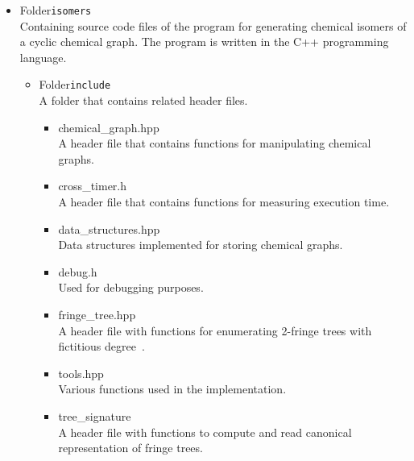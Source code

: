 \documentclass[11pt,titlepage,dvipdfmx,twoside]{article}
\begin{document}
%
\begin{itemize}
\item Folder{\tt isomers}\\
	Containing source code files of the program for generating chemical isomers of a cyclic chemical graph.
	The program is written in the C++ programming language.
	\begin{itemize}
	\item Folder{\tt include}\\
		A folder that contains related header files.
		\begin{itemize}
			\item{chemical\_graph.hpp}\\
			  A header file that contains functions for manipulating 
			  chemical graphs.
			\item{cross\_timer.h}\\
				A header file that contains functions for 
				measuring execution time.
				
			\item{data\_structures.hpp}\\
				Data structures implemented for storing 
				chemical graphs.
				
			\item{debug.h}\\
				Used for debugging purposes.
				
			\item{fringe\_tree.hpp}\\
				A header file with functions for enumerating 
				2-fringe trees with fictitious degree~\cite{branch}.
				
			\item{tools.hpp}\\
				Various functions used in the implementation.
				
			\item{tree\_signature}\\
				A header file with functions to compute and read canonical representation of fringe trees.
					

\end{itemize}
\end{itemize}
\end{itemize}
\end{document}
